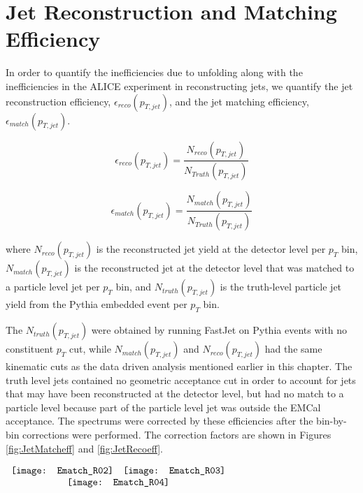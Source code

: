\section{Jet Reconstruction and Matching Efficiency}
In order to quantify the inefficiencies due to unfolding along with the inefficiencies in the ALICE experiment in reconstructing jets, we quantify the jet reconstruction efficiency, $\epsilon_{reco} (p_{T, jet})$, and the jet matching efficiency, $\epsilon_{match} (p_{T, jet})$.

\begin{equation}
 \epsilon_{reco} (p_{T, jet}) = \frac{N_{reco}(p_{T, jet}) }{N_{Truth} (p_{T, jet})}
\label{eq:jetrecoeff}
\end{equation}

\begin{equation}
 \epsilon_{match} (p_{T, jet}) = \frac{N_{match}(p_{T, jet}) }{N_{Truth}(p_{T, jet})}
\label{eq:jetmatchoeff}
\end{equation}

\noindent 
where $N_{reco} (p_{T, jet})$ is the reconstructed jet yield at the detector level per $p_{T}$ bin, $N_{match}(p_{T, jet})$ is the reconstructed jet at the detector level that was matched to a particle level jet per $p_{T}$ bin, and $N_{truth} (p_{T, jet})$ is the truth-level particle jet yield from the Pythia embedded event per $p_{T}$ bin.  

The $N_{truth} (p_{T, jet})$ were obtained by running FastJet on Pythia events with no constituent $p_{T}$ cut, while $N_{match}(p_{T, jet})$ and $N_{reco} (p_{T, jet})$ had the same kinematic cuts as the data driven analysis mentioned earlier in this chapter.  The truth level jets contained no geometric acceptance cut in order to account for jets that may have been reconstructed at the detector level, but had no match to a particle level because part of the particle level jet was outside the EMCal acceptance.  The spectrums were corrected by these efficiencies after the bin-by-bin corrections were performed.  The correction factors are shown in Figures \ref{fig:JetMatcheff} and \ref{fig:JetRecoeff}.

\begin{figure*}[t!]
$\begin{array}{rl}
    \texttt{[image: Ematch\_R02]} &
    \texttt{[image: Ematch\_R03]}\\
    \multicolumn{2}{c}{\texttt{[image: Ematch\_R04]}}
\end{array}$
\caption[Jet reconstruction efficiency for jets between R = 0.2 and R = 0.4. ]{\label{fig:JetMatcheff}Jet matching efficiency for jets between R = 0.2 and R = 0.4.}
\end{figure*}

